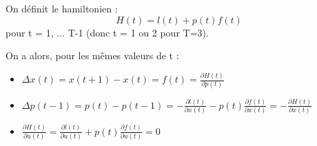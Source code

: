 \documentclass[10pt]{article}
\begin{document}
On définit le hamiltonien :
\[ H(t) =l(t) + p(t) f(t) \]
pour t = 1, ... T-1 (donc t = 1 ou 2 pour T=3).

On a alors, pour les mêmes valeurs de t :
\begin{itemize}
     \setlength{\itemsep}{1pt}
     \setlength{\parskip}{0pt}
     \setlength{\parsep}{0pt}
\item \( \Delta x(t) = x(t+1) - x(t) = f(t) = \frac{\partial H(t)}{\partial p(t)} \)
\item \( \Delta p(t-1) = p(t) - p(t-1) = - \frac{\partial l(t)}{\partial x(t)} - p(t) \frac{\partial f(t)}{\partial x(t)} = - \frac{\partial H(t)}{\partial x(t)} \)
\item \( \frac{\partial H(t)}{\partial u(t)} = \frac{\partial l(t)}{\partial u(t)} + p(t) \frac{\partial f(t)}{\partial u(t)} = 0 \)
\end{itemize}
\end{document}
